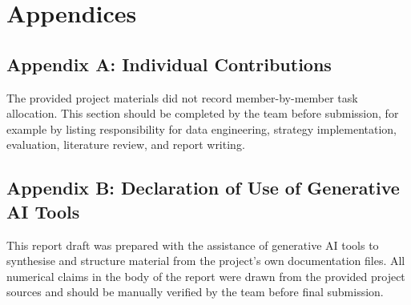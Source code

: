 \documentclass[11pt,twoside,a4paper]{article}
\begin{document}
\newpage
\section*{Appendices}
\subsection*{Appendix A: Individual Contributions}
The provided project materials did not record member-by-member task allocation. This section should be completed by the team before submission, for example by listing responsibility for data engineering, strategy implementation, evaluation, literature review, and report writing.

\subsection*{Appendix B: Declaration of Use of Generative AI Tools}
This report draft was prepared with the assistance of generative AI tools to synthesise and structure material from the project's own documentation files. All numerical claims in the body of the report were drawn from the provided project sources and should be manually verified by the team before final submission.
\end{document}
